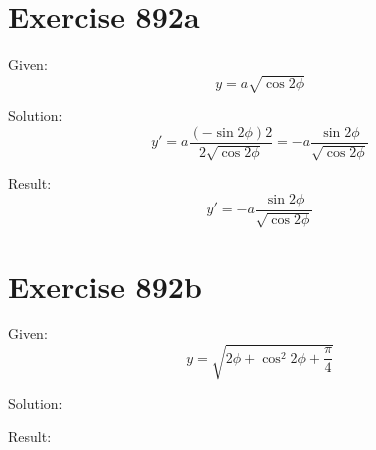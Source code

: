 \documentclass[a4paper, 10pt]{scrartcl}
\begin{document}
\section{Exercise 892a}

Given:
\[
y = a\sqrt{\cos{2\phi}}
\]

Solution:
\[
y' = a\frac{(-\sin{2\phi})2}{2\sqrt{\cos{2\phi}}} = -a\frac{\sin{2\phi}}{\sqrt{\cos{2\phi}}}
\]

Result:
\[
y' = -a\frac{\sin{2\phi}}{\sqrt{\cos{2\phi}}}
\]

\section{Exercise 892b}

Given:
\[
y = \sqrt{2\phi + \cos^{2}{2\phi + \frac{\pi}{4}}}
\]

Solution:

Result:
\end{document}
